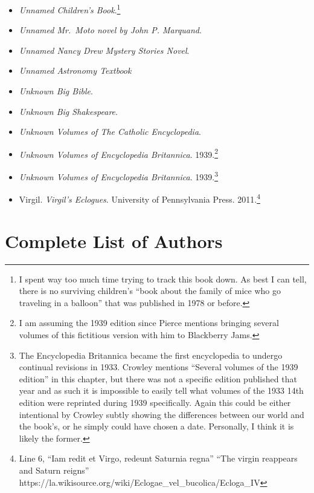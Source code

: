 \documentclass[12pt]{article}
\begin{document}
\begin{itemize}
\item
  \emph{Unnamed Children's Book}.\footnote{I spent way too much time trying to track this book down. As best I can tell, there is no surviving children's ``book about the family of mice who go traveling in a balloon'' that was published in 1978 or before.}
\item
  \emph{Unnamed Mr.~Moto novel by John P. Marquand}.
\item
  \emph{Unnamed Nancy Drew Mystery Stories Novel}.
\item
  \emph{Unnamed Astronomy Textbook}
\item
  \emph{Unknown Big Bible}.
\item
  \emph{Unknown Big Shakespeare}.
\item
  \emph{Unknown Volumes of The Catholic Encyclopedia}.
\item
  \emph{Unknown Volumes of Encyclopedia Britannica}. 1939.\footnote{I am assuming the 1939 edition since Pierce mentions bringing several volumes of this fictitious version with him to Blackberry Jams.}
\item
  \emph{Unknown Volumes of Encyclopedia Britannica}. 1939.\footnote{The Encyclopedia Britannica became the first encyclopedia to undergo continual revisions in 1933. Crowley mentions ``Several volumes of the 1939 edition'' in this chapter, but there was not a specific edition published that year and as such it is impossible to easily tell what volumes of the 1933 14th edition were reprinted during 1939 specifically. Again this could be either intentional by Crowley subtly showing the differences between our world and the book's, or he simply could have chosen a date. Personally, I think it is likely the former.}
\item
  Virgil. \emph{Virgil's Eclogues}. University of Pennsylvania Press. 2011.\footnote{Line 6, ``Iam redit et Virgo, redeunt Saturnia regna'' ``The virgin reappears and Saturn reigns'' https://la.wikisource.org/wiki/Eclogae\_vel\_bucolica/Ecloga\_IV}
\end{itemize}

\section{Complete List of Authors}\label{complete-list-of-authors}
\end{document}
